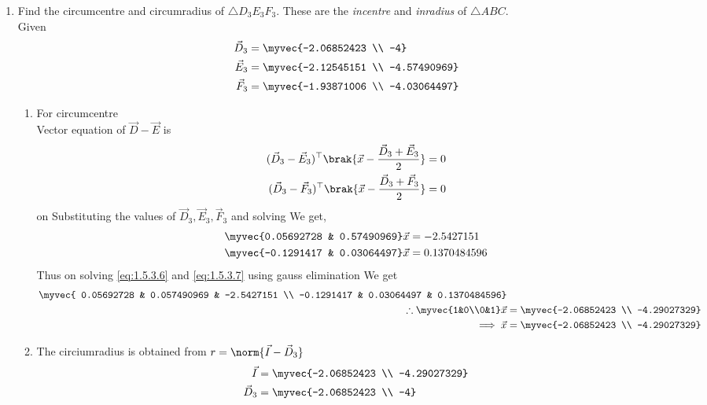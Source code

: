\documentclass[11pt]{book}
\begin{document}
\begin{enumerate}[label=\thesection.\arabic*.,ref=\thesection.\theenumi]
\item Find the circumcentre and circumradius of $\triangle D_3E_3F_3$.  These are the {\em incentre} and {\em inradius} of $\triangle ABC$. \\
\solution Given 
\begin{align}
    \vec{D}_3 &= \myvec{-2.06852423  \\ -4}\\
    \vec{E}_3 &= \myvec{-2.12545151  \\ -4.57490969} \\
    \vec{F}_3 &= \myvec{-1.93871006  \\ -4.03064497}
\end{align}
\begin{enumerate}
\item For circumcentre \\
Vector equation of $\vec{D}-\vec{E}$ is
\begin{align}
(\vec{D}_3-\vec{E}_3)^\top\brak{ \vec{x} - \frac{\vec{D}_3+\vec{E}_3}{2}} = 0 \\
(\vec{D}_3-\vec{F}_3)^\top\brak{ \vec{x} - \frac{\vec{D}_3+\vec{F}_3}{2}} = 0
\end{align}
on Substituting the values of $\vec{D}_3, \vec{E}_3, \vec{F}_3$ and solving We get,
\begin{align}
     \myvec{0.05692728 & 0.57490969}\vec{x} &= -2.5427151 \label{eq:1.5.3.6} \\
     \myvec{-0.1291417 & 0.03064497}\vec{x} &= 0.1370484596\label{eq:1.5.3.7}
\end{align}
Thus on solving \eqref{eq:1.5.3.6} and \eqref{eq:1.5.3.7} using gauss elimination We get
\begin{align}
    \myvec{ 0.05692728 & 0.057490969 & -2.5427151 \\ -0.1291417 & 0.03064497 & 0.1370484596} \\
    \therefore \myvec{1&0\\0&1}\vec{x} &= \myvec{-2.06852423 \\ -4.29027329}\\
\implies \vec{x}&=\myvec{-2.06852423 \\ -4.29027329}
\end{align}
\item The circiumradius is obtained from  $ r=\norm{\vec{I}-\vec{D}_3}$
   \begin{align}
       \vec{I} &= \myvec{-2.06852423 \\ -4.29027329} \\
       \vec{D}_3 &= \myvec{-2.06852423  \\ -4} \\

\end{align}
\end{enumerate}
\end{enumerate}
\end{document}
